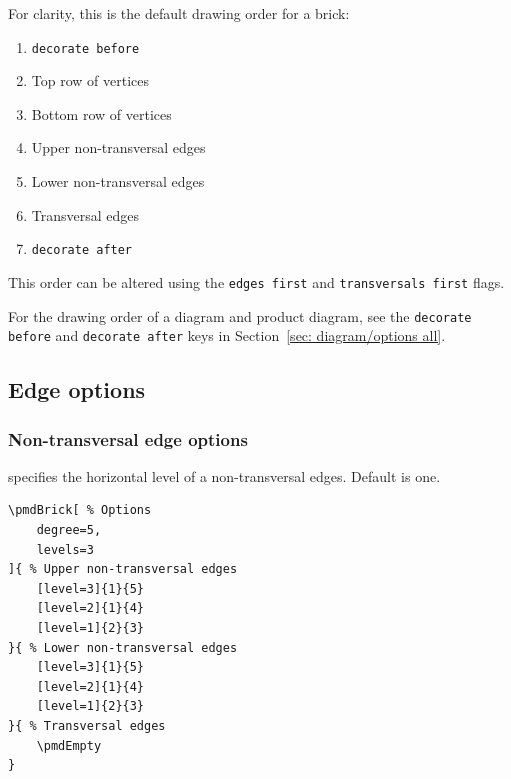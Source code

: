 \documentclass{ltxdoc}
\begin{document}
For clarity, this is the default drawing order for a brick:
\begin{enumerate}
    \item \texttt{decorate before}
    \item Top row of vertices
    \item Bottom row of vertices
    \item Upper non-transversal edges
    \item Lower non-transversal edges
    \item Transversal edges
    \item \texttt{decorate after}
\end{enumerate}

This order can be altered using the \texttt{edges first} and \texttt{transversals first} flags.

For the drawing order of a diagram and product diagram, see the \texttt{decorate before} and \texttt{decorate after} keys in Section~\ref{sec: diagram/options all}.

\subsection{Edge options} \label{sec: edge/options}

\subsubsection{Non-transversal edge options} \label{sec: NT edge/options}

specifies the horizontal level of a non-transversal edges. Default is one.
\begin{center}
    \begin{minipage}{\dimexpr0.85\textwidth-2\fboxrule-2\fboxsep\relax}
        \begin{minipage}[c]{0.4\linewidth}
\begin{verbatim}
\pmdBrick[ % Options
    degree=5,
    levels=3
]{ % Upper non-transversal edges
    [level=3]{1}{5}
    [level=2]{1}{4}
    [level=1]{2}{3}
}{ % Lower non-transversal edges
    [level=3]{1}{5}
    [level=2]{1}{4}
    [level=1]{2}{3}
}{ % Transversal edges
    \pmdEmpty
}
\end{verbatim}
        \end{minipage}
        \hfill
        \begin{minipage}[c]{0.4\linewidth}
        \end{minipage}
    \end{minipage}%
\end{center}
\end{document}
